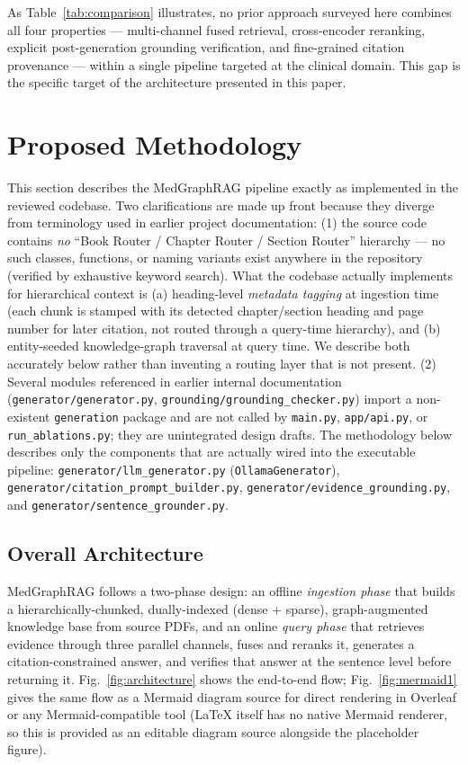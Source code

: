 \documentclass[conference]{IEEEtran}
\begin{document}
As Table~\ref{tab:comparison} illustrates, no prior approach surveyed here combines all four properties --- multi-channel fused retrieval, cross-encoder reranking, explicit post-generation grounding verification, and fine-grained citation provenance --- within a single pipeline targeted at the clinical domain. This gap is the specific target of the architecture presented in this paper.

\section{Proposed Methodology}

This section describes the MedGraphRAG pipeline exactly as implemented in the reviewed codebase. Two clarifications are made up front because they diverge from terminology used in earlier project documentation: (1) the source code contains \emph{no} ``Book Router / Chapter Router / Section Router'' hierarchy — no such classes, functions, or naming variants exist anywhere in the repository (verified by exhaustive keyword search). What the codebase actually implements for hierarchical context is (a) heading-level \emph{metadata tagging} at ingestion time (each chunk is stamped with its detected chapter/section heading and page number for later citation, not routed through a query-time hierarchy), and (b) entity-seeded knowledge-graph traversal at query time. We describe both accurately below rather than inventing a routing layer that is not present. (2) Several modules referenced in earlier internal documentation (\texttt{generator/generator.py}, \texttt{grounding/grounding\_checker.py}) import a non-existent \texttt{generation} package and are not called by \texttt{main.py}, \texttt{app/api.py}, or \texttt{run\_ablations.py}; they are unintegrated design drafts. The methodology below describes only the components that are actually wired into the executable pipeline: \texttt{generator/llm\_generator.py} (\texttt{OllamaGenerator}), \texttt{generator/citation\_prompt\_builder.py}, \texttt{generator/evidence\_grounding.py}, and \texttt{generator/sentence\_grounder.py}.

\subsection{Overall Architecture}
MedGraphRAG follows a two-phase design: an offline \emph{ingestion phase} that builds a hierarchically-chunked, dually-indexed (dense + sparse), graph-augmented knowledge base from source PDFs, and an online \emph{query phase} that retrieves evidence through three parallel channels, fuses and reranks it, generates a citation-constrained answer, and verifies that answer at the sentence level before returning it. Fig.~\ref{fig:architecture} shows the end-to-end flow; Fig.~\ref{fig:mermaid1} gives the same flow as a Mermaid diagram source for direct rendering in Overleaf or any Mermaid-compatible tool (LaTeX itself has no native Mermaid renderer, so this is provided as an editable diagram source alongside the placeholder figure).
\end{document}
